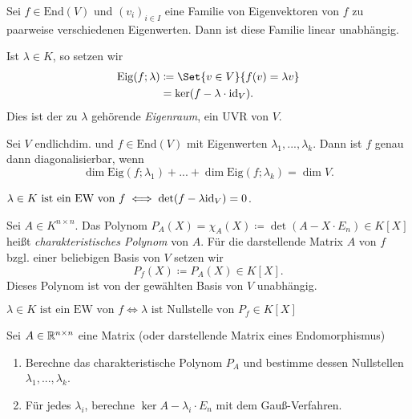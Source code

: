 \documentclass{cheat-sheet}
\newcommand{\End}{\mathrm{End}}
\newcommand{\Eig}{\mathrm{Eig}}
\begin{document}
\begin{satz}
Sei $f \in \End(V)$ und $(v_i)_{i \in I}$ eine Familie von Eigenvektoren von $f$ zu paarweise verschiedenen Eigenwerten. Dann ist diese Familie linear unabhängig.
\end{satz}

\begin{defn}
Ist $\lambda \in K$, so setzen wir
\begin{align*}
\Eig(f; \lambda) &\coloneqq \Set{ v \in V }{ f(v) = \lambda v }\\
&= \ker(f - \lambda \cdot \id_V).
\end{align*}
Dies ist der zu $\lambda$ gehörende \emph{Eigenraum}, ein UVR von $V$.
\end{defn}

\begin{satz}
Sei $V$ endlichdim. und $f \in \End(V)$ mit Eigenwerten $\lambda_1, ..., \lambda_k$. Dann ist $f$ genau dann diagonalisierbar, wenn
\[ \dim \Eig(f; \lambda_1) + ... + \dim \Eig(f; \lambda_k) = \dim V. \]
\end{satz}

\begin{satz}
$\lambda \in K \text{ ist ein EW von } f \iff \det(f - \lambda \mathrm{id}_V) = 0$.
\end{satz}

\begin{defn}
Sei $A \in K^{n \times n}$. Das Polynom $P_A(X) = \chi_A(X) \coloneqq \det(A - X \cdot E_n) \in K[X]$ heißt \emph{charakteristisches Polynom} von $A$. Für die darstellende Matrix $A$ von $f$ bzgl. einer beliebigen Basis von $V$ setzen wir
\[ P_f(X) \coloneqq P_A(X) \in K[X]. \]
Dieses Polynom ist von der gewählten Basis von $V$ unabhängig.
\end{defn}

\begin{satz}
$\lambda \in K \text{ ist ein EW von } f \iff \lambda \text{ ist Nullstelle von } P_f \in K[X]$
\end{satz}

\begin{verf}
Sei $A \in \mathbb{R}^{n \times n}$ eine Matrix (oder darstellende Matrix eines Endomorphismus)
\begin{enumerate}
  \item Berechne das charakteristische Polynom $P_A$ und bestimme dessen Nullstellen $\lambda_1, ..., \lambda_k$.
  \item Für jedes $\lambda_i$, berechne $\ker A - \lambda_i \cdot E_n$ mit dem Gauß-Verfahren.
\end{enumerate}
\end{verf}
\end{document}
